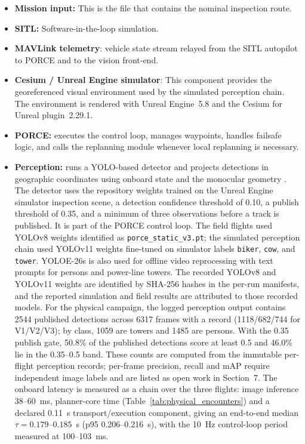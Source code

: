 \documentclass[electronics,article,submit,moreauthors]{Definitions/mdpi}
\DeclareRobustCommand{\deleted}[1]{}%
\DeclareRobustCommand{\added}[1]{#1}%
\DeclareRobustCommand{\deleted}[1]{\textcolor{black}{\sout{#1}}}
\DeclareRobustCommand{\added}[1]{\textcolor{green!50!black}{#1}}
\def\deleted#1{}%
\def\added#1{#1}%
\begin{document}
\begin{itemize}
    \item \textbf{Mission input:} This is the file that contains the nominal inspection route.
    \item \textbf{SITL:} Software-in-the-loop simulation.
    \item \textbf{MAVLink telemetry}: vehicle state stream relayed from the SITL autopilot to PORCE and to the vision front-end.
    \item \textbf{Cesium / Unreal Engine simulator}: \deleted{It is the}\added{This component provides the georeferenced} visual \deleted{Source of the environment.}\added{environment used by the simulated perception chain. The environment is rendered with Unreal Engine~5.8 and the Cesium for Unreal plugin~2.29.1.}
    \item \textbf{PORCE:} executes the control loop, manages waypoints, handles failsafe logic, and calls the replanning module whenever local replanning is necessary.
         \item \textbf{Perception:} runs a YOLO-based detector and projects detections in geographic coordinates using onboard state and the monocular geometry \cite{alaez2023real}. The detector uses the repository weights trained on the Unreal Engine simulator inspection scene, a detection confidence threshold of 0.10, a publish threshold of 0.35, and a minimum of three observations before a track is published. It is part of the PORCE control loop.
\added{The field flights used YOLOv8 weights identified as \texttt{porce\_static\_v3.pt}; the simulated perception chain used YOLOv11 weights fine-tuned on simulator labels \texttt{biker}, \texttt{cow}, and \texttt{tower}. YOLOE-26s is also used for offline video reprocessing with text prompts for persons and power-line towers. The recorded YOLOv8 and YOLOv11 weights are identified by SHA-256 hashes in the per-run manifests, and the reported simulation and field results are attributed to those recorded models. }
\added{For the physical campaign, the logged perception output contains 2544 published detections across 6317 frames with a record (1118/682/744 for V1/V2/V3); by class, 1059 are towers and 1485 are persons. With the 0.35 publish gate, 50.8\% of the published detections score at least 0.5 and 46.0\% lie in the 0.35--0.5 band. These counts are computed from the immutable per-flight perception records; per-frame precision, recall and mAP require independent image labels and are listed as open work in Section~7. The onboard latency is measured as a chain over the three flights: image inference 38--60~ms, planner-core time (Table~\ref{tab:physical_encounters}) and a declared 0.11~s transport/execution component, giving an end-to-end median $\tau=0.179$--$0.185$~s (p95 0.206--0.216~s), with the 10~Hz control-loop period measured at 100--103~ms.}



\end{itemize}
\end{document}
